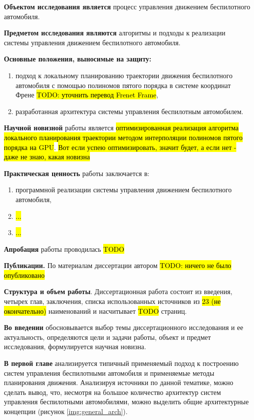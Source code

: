 \textbf{Объектом исследования является} процесс управления движением беспилотного автомобиля.

\textbf{Предметом исследования являются} алгоритмы и подходы к реализации системы управления движением
беспилотного автомобиля.

\textbf{Основные положения, выносимые на защиту:}
\begin{enumerate}
    \item подход к локальному планированию траектории движения беспилотного автомобиля с помощью
          полиномов пятого порядка в системе координат Френе \hl{TODO: уточнить перевод Frenet Frame},
    \item разработанная архитектура системы управления беспилотным автомобилем.
\end{enumerate}

\textbf{Научной новизной} работы является \hl{оптимизированная реализация алгоритма локального планирования
    траектории методом интерполяции полиномов пятого порядка на GPU}.
\hl{Вот если успею оптимизировать, значит будет, а если нет - даже не знаю, какая новизна}

\textbf{Практическая ценность} работы заключается в:
\begin{enumerate}
    \item программной реализации системы управления движением беспилотного автомобиля,
    \item \hl{...}
    \item \hl{...}
\end{enumerate}

\textbf{Апробация} работы проводилась \hl{TODO}

\textbf{Публикации.} По материалам диссертации автором \hl{TODO: ничего не было опубликовано}

\textbf{Структура и объем работы}. Диссертационная работа состоит из введения, четырех глав, заключения, 
списка использованных источников из \hl{23 (не окончательно)} наименований и насчитывает \hl{TODO} страниц.

\textbf{Во введении} обосновывается выбор темы диссертационного исследования и ее актуальность,
определяются цели и задачи работы, объект и предмет исследования, формулируется научная новизна.

\textbf{В первой главе} анализируется типичный применяемый подход к построению систем управления
беспилотными автомобиля и применяемые методы планирования движения. Анализируя источники по данной тематике,
можно сделать вывод, что, несмотря на большое количество архитектур систем управления беспилотными
автомобилями, можно выделить общие архитектурные концепции (рисунок \ref{img:general_arch}).

